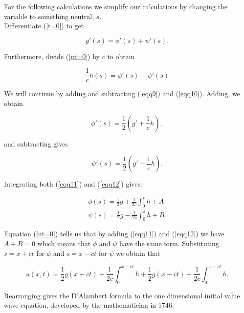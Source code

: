 \documentclass[a4paper, 12pt]{article}
\numberwithin{equation}{section}
\begin{document}
For the following calculations we simplify our calculations by changing the variable to something neutral, $s$. 
\\

Differentiate (\ref{t=0}) to get

\begin{equation} \label{eqq9}
    g'(s)=\phi'(s)+\psi'(s).
\end{equation}

Furthermore, divide (\ref{ut=0}) by $c$ to obtain

\begin{equation} \label{eqq10}
    \frac{1}{c}h(s)=\phi'(s)-\psi'(s)
\end{equation}

We will continue by adding and subtracting (\ref{eqq9}) and (\ref{eqq10}). Adding, we obtain

\begin{equation} \label{eqq11}
    \phi'(s)=\frac{1}{2}(g'+\frac{1}{c}h),
\end{equation}

and subtracting gives

\begin{equation} \label{eqq12}
    \psi'(s)=\frac{1}{2}(g'-\frac{1}{c}h).
\end{equation}

Integrating both (\ref{eqq11}) and (\ref{eqq12}) gives:

\begin{equation}
    \begin{aligned}
    \phi(s)=\frac{1}{2}g+\frac{1}{2c}\int^s_0h+A\\
    \psi(s)=\frac{1}{2}g-\frac{1}{2c}\int^s_0h+B.
    \end{aligned}
\end{equation}

Equation (\ref{ut=0}) tells us that by adding (\ref{eqq11}) and (\ref{eqq12}) we have $A+B=0$ which means that $\phi$ and $\psi$ have the
same form. \cite{Str} Substituting $s=x+ct$ for $\phi$ and $s=x-ct$ for $\psi$ we obtain that

\begin{equation}
    u(x,t)=\frac{1}{2}g(x+ct)+\frac{1}{2c}\int^{x+ct}_0h+\frac{1}{2}g(x-ct)-\frac{1}{2c}\int^{x-ct}_0h.
\end{equation}

Rearranging gives the D'Alambert formula to the one dimensional initial value wave equation, developed by the mathematician in 1746: \cite{Str}
\end{document}
